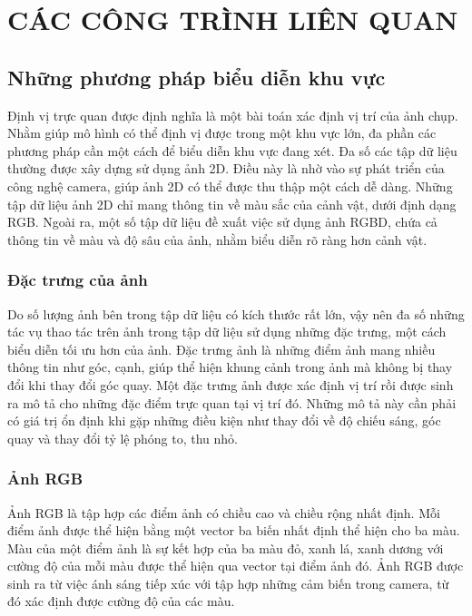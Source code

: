 \chapter{CÁC CÔNG TRÌNH LIÊN QUAN}

\section{Những phương pháp biểu diễn khu vực}

Định vị trực quan được định nghĩa là một bài toán xác định vị trí của ảnh chụp. Nhằm giúp mô hình có thể định vị được trong một khu vực lớn, đa phần các phương pháp cần một cách để biểu diễn khu vực đang xét. Đa số các tập dữ liệu thường được xây dựng sử dụng ảnh 2D. Điều này là nhờ vào sự phát triển của công nghệ camera, giúp ảnh 2D có thể được thu thập một cách dễ dàng. Những tập dữ liệu ảnh 2D chỉ mang thông tin về màu sắc của cảnh vật, dưới định dạng RGB. Ngoài ra, một số tập dữ liệu đề xuất việc sử dụng ảnh RGBD, chứa cả thông tin về màu và độ sâu của ảnh, nhằm biểu diễn rõ ràng hơn cảnh vật.

\subsection{Đặc trưng của ảnh}

Do số lượng ảnh bên trong tập dữ liệu có kích thước rất lớn, vậy nên đa số những tác vụ thao tác trên ảnh trong tập dữ liệu sử dụng những đặc trưng, một cách biểu diễn tối ưu hơn của ảnh. Đặc trưng ảnh là những điểm ảnh mang nhiều thông tin như góc, cạnh, giúp thể hiện khung cảnh trong ảnh mà không bị thay đổi khi thay đổi góc quay. Một đặc trưng ảnh được xác định vị trí rồi được sinh ra mô tả cho những đặc điểm trực quan tại vị trí đó. Những mô tả này cần phải có giá trị ổn định khi gặp những điều kiện như thay đổi về độ chiếu sáng, góc quay và thay đổi tỷ lệ phóng to, thu nhỏ.

\subsection{Ảnh RGB}

Ảnh RGB là tập hợp các điểm ảnh có chiều cao và chiều rộng nhất định. Mỗi điểm ảnh được thể hiện bằng một vector ba biến nhất định thể hiện cho ba màu. Màu của một điểm ảnh là sự kết hợp của ba màu đỏ, xanh lá, xanh dương với cường độ của mỗi màu được thể hiện qua vector tại điểm ảnh đó. Ảnh RGB được sinh ra từ việc ánh sáng tiếp xúc với tập hợp những cảm biến trong camera, từ đó xác định được cường độ của các màu.

